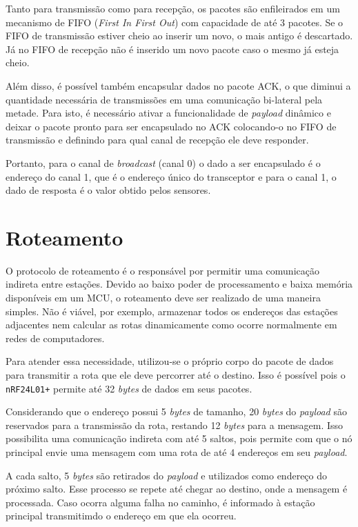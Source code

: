 {Tanto para transmissão como para recepção, os pacotes são enfileirados em um mecanismo de FIFO (\textit{First
In First Out}) com capacidade de até 3 pacotes. Se o FIFO de transmissão estiver cheio ao inserir um novo, o
mais antigo é descartado. Já no FIFO de recepção não é inserido um novo pacote caso o mesmo já esteja cheio.

Além disso, é possível também encapsular dados no pacote ACK, o que diminui a quantidade necessária de
transmissões em uma comunicação bi-lateral pela metade. Para isto, é necessário ativar a funcionalidade de
\textit{payload} dinâmico e deixar o pacote pronto para ser encapsulado no ACK colocando-o no FIFO de
transmissão e definindo para qual canal de recepção ele deve responder.

Portanto, para o canal de \textit{broadcast} (canal 0) o dado a ser encapsulado é o endereço do canal 1, que é o
endereço único do transceptor e para o canal 1, o dado de resposta é o valor obtido pelos sensores.

\section{Roteamento}
O protocolo de roteamento é o responsável por permitir uma comunicação indireta entre estações. Devido ao
baixo poder de processamento e baixa memória disponíveis em um MCU, o roteamento deve ser realizado de uma
maneira simples. Não é viável, por exemplo, armazenar todos os endereços das estações adjacentes nem
calcular as rotas dinamicamente como ocorre normalmente em redes de computadores.

Para atender essa necessidade, utilizou-se o próprio corpo do pacote de dados para transmitir a rota
que ele deve percorrer até o destino. Isso é possível pois o \texttt{nRF24L01+} permite até 32
\textit{bytes} de dados em seus pacotes.

Considerando que o endereço possui 5 \textit{bytes} de tamanho, 20 \textit{bytes} do \textit{payload} são
reservados para a transmissão da rota, restando 12 \textit{bytes} para a mensagem. Isso possibilita uma
comunicação indireta com até 5 saltos, pois permite com que o nó principal envie uma mensagem com uma rota de
até 4 endereços em seu \textit{payload}.

A cada salto, 5 \textit{bytes} são retirados do \textit{payload} e utilizados como endereço do próximo salto.
Esse processo se repete até chegar ao destino, onde a mensagem é processada. Caso ocorra alguma falha no
caminho, é informado à estação principal transmitimdo o endereço em que ela ocorreu.

}
